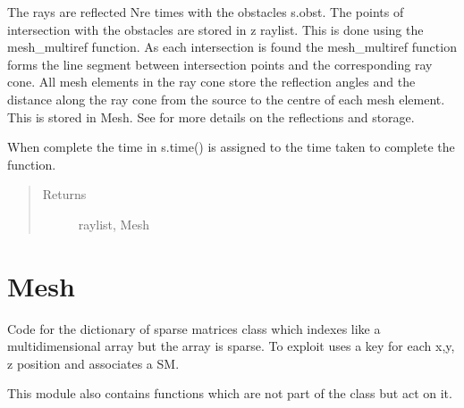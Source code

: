\documentclass[letterpaper,10pt,english]{sphinxmanual}
\begin{document}
\begin{fulllineitems}
\begin{fulllineitems}
The rays are reflected Nre times with the obstacles s.obst.     The points of intersection with the obstacles are stored in z
raylist. This is done using the mesh\_multiref function.
As each intersection is found the mesh\_multiref function     forms the line segment between intersection points and the     corresponding ray cone. All mesh elements in the ray cone store     the reflection angles and the distance along the ray cone from the     source to the centre of each mesh element. This is stored in Mesh.
See  for more details on the     reflections and storage.

When complete the time in s.time() is assigned to the time taken     to complete the function.
\begin{quote}\begin{description}
\item[{Returns}] \leavevmode
raylist, Mesh

\end{description}\end{quote}

\end{fulllineitems}


\end{fulllineitems}



\chapter{Mesh}
\label{index:module-DictionarySparseMatrix}\label{index:mesh}
Code for the dictionary of sparse matrices class {\hyperref[index:DictionarySparseMatrix.DS]{}} which indexes like a multidimensional array but the array is sparse.  To exploit  uses a key for  each x,y, z position and associates a SM.

This module also contains functions which are not part of the class  but act on it.
\end{document}

